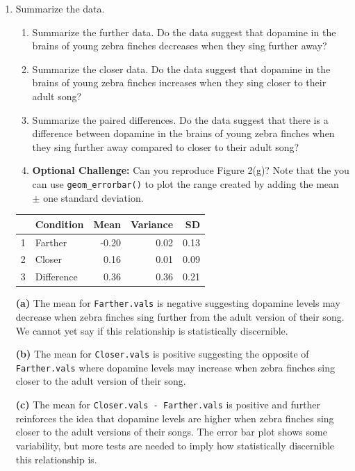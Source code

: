\documentclass{article}\usepackage[]{graphicx}\usepackage[]{xcolor}
\begin{document}
\begin{enumerate}
\item Summarize the data.
\begin{enumerate}
  \item Summarize the further data. Do the data suggest that
   dopamine in the brains of young zebra finches decreases when
   they sing further away?
   \item Summarize the closer data. Do the data suggest that
   dopamine in the brains of young zebra finches increases when
   they sing closer to their adult song?
  \item Summarize the paired differences. Do the data suggest
  that there is a difference between dopamine in the brains of
  young zebra finches when they sing further away compared to 
  closer to their adult song?
  \item \textbf{Optional Challenge:} Can you reproduce Figure 2(g)?
  Note that the you can use \texttt{geom\_errorbar()} to plot
  the range created by adding the mean $\pm$ one standard deviation.
\end{enumerate}

\begin{table}[ht]
\centering
\begin{tabular}{rlrrr}
  \hline
 & Condition & Mean & Variance & SD \\ 
  \hline
1 & Farther & -0.20 & 0.02 & 0.13 \\ 
  2 & Closer & 0.16 & 0.01 & 0.09 \\ 
  3 & Difference & 0.36 & 0.36 & 0.21 \\ 
   \hline
\end{tabular}
\end{table}

\textbf{(a)} The mean for \texttt{Farther.vals} is negative suggesting dopamine levels may decrease when zebra finches sing further from the adult version of their song. We cannot yet say if this relationship is statistically discernible. 

\textbf{(b)} The mean for \texttt{Closer.vals} is positive suggesting the opposite of \texttt{Farther.vals} where dopamine levels may increase when zebra finches sing closer to the adult version of their song.

\textbf{(c)} The mean for \texttt{Closer.vals - Farther.vals} is positive and further reinforces the idea that dopamine levels are higher when zebra finches sing closer to the adult versions of their songs. The error bar plot shows some variability, but more tests are needed to imply how statistically discernible this relationship is. 


\end{enumerate}
\end{document}
